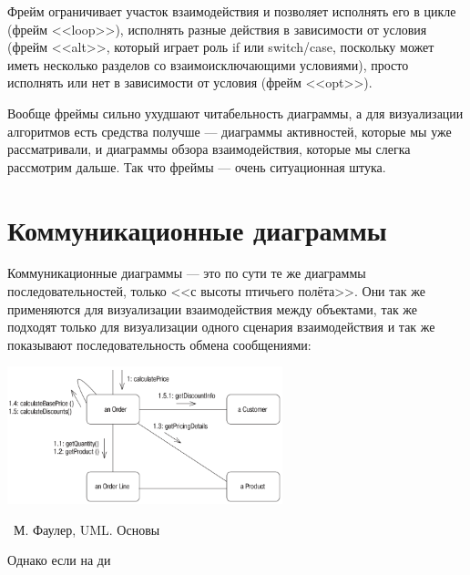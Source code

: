 \documentclass[a5paper]{article}
\newcommand{\attribution}[1] {
	\vspace{-5mm}\begin{flushright}\begin{scriptsize}%
	{\textcopyright\, #1}\end{scriptsize}\end{flushright}
}
\begin{document}
Фрейм ограничивает участок взаимодействия и позволяет исполнять его в цикле (фрейм <<loop>>), исполнять разные действия в зависимости от условия (фрейм <<alt>>, который играет роль if или switch/case, поскольку может иметь несколько разделов со взаимоисключающими условиями), просто исполнять или нет в зависимости от условия (фрейм <<opt>>).

Вообще фреймы сильно ухудшают читабельность диаграммы, а для визуализации алгоритмов есть средства получше --- диаграммы активностей, которые мы уже рассматривали, и диаграммы обзора взаимодействия, которые мы слегка рассмотрим дальше. Так что фреймы --- очень ситуационная штука.

\section{Коммуникационные диаграммы}

Коммуникационные диаграммы --- это по сути те же диаграммы последовательностей, только <<с высоты птичьего полёта>>. Они так же применяются для визуализации взаимодействия между объектами, так же подходят только для визуализации одного сценария взаимодействия и так же показывают последовательность обмена сообщениями:

\begin{center}
	\includegraphics[width=0.6\textwidth]{communicationDiagram.png}
	\attribution{М. Фаулер, UML. Основы}
\end{center}

Однако если на ди
\end{document}
